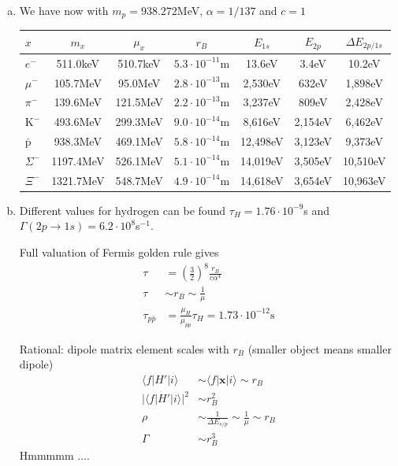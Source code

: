 \documentclass[10pt,a4paper]{book}
\theoremstyle{definition}
\begin{document}
\begin{enumerate}[(a)]
\item We have now with $m_p=938.272$MeV, $\alpha=1/137$ and $c=1$ 
\begin{center}
\begin{tabular}{lcccccc}
$x$              & $m_x$       & $\mu_x$ & $r_B$ & $E_{1s}$ & $E_{2p}$ & $\Delta E_{2p/1s}$ \\ \hline
$e^-$            & 511.0keV  & 510.7keV & $5.3\cdot10^{-11}$m &   13.6eV &   3.4eV &  10.2eV\\
$\mu^-$          & 105.7MeV  &  95.0MeV & $2.8\cdot10^{-13}$m &  2,530eV &   632eV & 1,898eV\\
$\pi^-$          & 139.6MeV  & 121.5MeV & $2.2\cdot10^{-13}$m &  3,237eV &   809eV & 2,428eV\\
$\text{K}^-$     & 493.6MeV  & 299.3MeV & $9.0\cdot10^{-14}$m &  8,616eV & 2,154eV & 6,462eV\\
$\bar{\text{p}}$ & 938.3MeV  & 469.1MeV & $5.8\cdot10^{-14}$m & 12,498eV & 3,123eV & 9,373eV\\
$\Sigma^-$       & 1197.4MeV & 526.1MeV & $5.1\cdot10^{-14}$m & 14,019eV & 3,505eV & 10,510eV\\
$\Xi^-$          & 1321.7MeV & 548.7MeV & $4.9\cdot10^{-14}$m & 14,618eV & 3,654eV & 10,963eV
\end{tabular}
\end{center}

\item Different values for hydrogen can be found $\tau_H=1.76\cdot10^{-9}$s and $\Gamma(2p\rightarrow1s) =6.2\cdot10^8$s$^{-1}$.

Full valuation of Fermis golden rule gives
\begin{align}
\tau&=\left(\frac{3}{2}\right)^8\frac{r_B}{c\alpha^4}\\
\tau&\sim r_B\sim\frac{1}{\mu}\\
\tau_{p\bar{p}}&=\frac{\mu_H}{\mu_{p\bar{p}}}\tau_H=1.73\cdot10^{-12}\text{s}
\end{align}

Rational: dipole matrix element scales with $r_B$ (smaller object means smaller dipole)
\begin{align}
\langle f|H'|i\rangle &\sim \langle f|\mathbf{x}|i\rangle\sim r_B\\
|\langle f|H'|i\rangle|^2 &\sim r_B^2\\
\rho&\sim \frac{1}{\Delta E_{s/p}}\sim\frac{1}{\mu}\sim r_B\\
\Gamma&\sim r_B^3
\end{align}
Hmmmmm ....

\end{enumerate}
\end{document}

